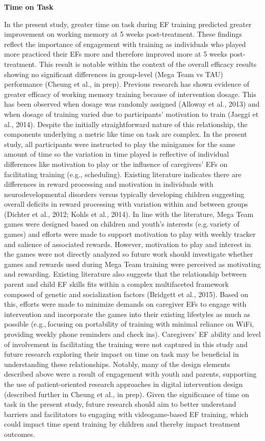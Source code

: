 \documentclass[
  letterpaper,
]{ut-thesis}
\begin{document}
\textbf{Time on Task}

In the present study, greater time on task during EF training predicted
greater improvement on working memory at 5 weeks post-treatment. These
findings reflect the importance of engagement with training as
individuals who played more practiced their EFs more and therefore
improved more at 5 weeks post-treatment. This result is notable within
the context of the overall efficacy results showing no significant
differences in group-level (Mega Team vs TAU) performance (Cheung et
al., in prep). Previous research has shown evidence of greater efficacy
of working memory training because of intervention dosage. This has been
observed when dosage was randomly assigned (Alloway et al., 2013) and
when dosage of training varied due to participants' motivation to train
(Jaeggi et al., 2014). Despite the initially straightforward nature of
this relationship, the components underlying a metric like time on task
are complex. In the present study, all participants were instructed to
play the minigames for the same amount of time so the variation in time
played is reflective of individual differences like motivation to play
or the influence of caregivers' EFs on facilitating training (e.g.,
scheduling). Existing literature indicates there are differences in
reward processing and motivation in individuals with neurodevelopmental
disorders versus typically developing children suggesting overall
deficits in reward processing with variation within and between groups
(Dichter et al., 2012; Kohls et al., 2014). In line with the literature,
Mega Team games were designed based on children and youth's interests
(e.g.\,variety of games) and efforts were made to support motivation to
play with weekly tracker and salience of associated rewards. However,
motivation to play and interest in the games were not directly analyzed
so future work should investigate whether games and rewards used during
Mega Team training were perceived as motivating and rewarding. Existing
literature also suggests that the relationship between parent and child
EF skills fits within a complex multifaceted framework composed of
genetic and socialization factors (Bridgett et al., 2015). Based on
this, efforts were made to minimize demands on caregiver EFs to engage
with intervention and incorporate the games into their existing
lifestyles as much as possible (e.g.,\,focusing on portability of
training with minimal reliance on WiFi, providing weekly phone reminders
and check ins). Caregivers' EF ability and level of involvement in
facilitating the training were not captured in this study and future
research exploring their impact on time on task may be beneficial in
understanding these relationships. Notably, many of the design elements
described above were a result of engagement with youth and parents,
supporting the use of patient-oriented research approaches in digital
intervention design (described further in Cheung et al., in prep). Given
the significance of time on task in the present study, future research
should aim to better understand barriers and facilitators to engaging
with videogame-based EF training, which could impact time spent training
by children and thereby impact treatment outcomes.
\end{document}
